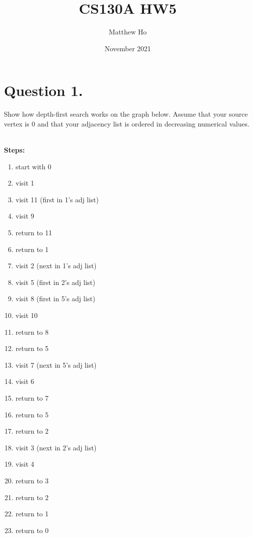 \documentclass{article}
\title{CS130A HW5}
\author{Matthew Ho}
\date{November 2021}
\begin{document}
\maketitle

\section{Question 1.}
Show how depth-first search works on the graph below. Assume that your source vertex is 0 and that your adjacency list is ordered in decreasing numerical values.
\\\\
\begin{minipage}[t]{.3\textwidth}

\textbf{Steps:}
\begin{enumerate}
	\item start with 0
	\item visit 1
	\item visit 11 (first in 1's adj list)
	\item visit 9
	\item return to 11
	\item return to 1
	\item visit 2 (next in 1's adj list)
	\item visit 5 (first in 2's adj list)
	\item visit 8 (first in 5's adj list)
	\item visit 10 
	\item return to 8
	\item return to 5
	\item visit 7 (next in 5's adj list)
	\item visit 6
	\item return to 7
	\item return to 5
	\item return to 2
	\item visit 3 (next in 2's adj list)
	\item visit 4
	\item return to 3
	\item return to 2
	\item return to 1
	\item return to 0
\end{enumerate}

\end{minipage}
\hspace{1cm}
\end{document}
